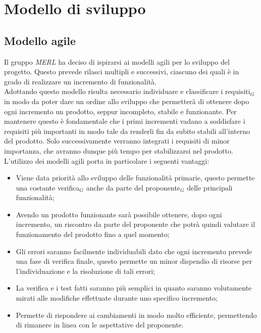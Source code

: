 \chapter{Modello di sviluppo}

\section{Modello agile}
Il gruppo \textit{MERL} ha deciso di ispirarsi ai modelli agili per lo sviluppo del progetto. Questo prevede rilasci multipli e successivi, ciascuno dei quali è in grado di realizzare un incremento di funzionalità.
\\Adottando questo modello risulta necessario individuare e classificare i requisiti$_G$ in modo da poter dare un ordine allo sviluppo che permetterà di ottenere dopo ogni incremento un prodotto, seppur incompleto, stabile e funzionante. Per mantenere questo è fondamentale che i primi incrementi vadano a soddisfare i requisiti più importanti in modo tale da renderli fin da subito stabili all'interno del prodotto. Solo successivamente verranno integrati i requisiti di minor importanza, che avranno dunque più tempo per stabilizzarsi nel prodotto.
\\L'utilizzo dei modelli agili porta in particolare i seguenti vantaggi:
\begin{itemize}
  \item Viene data priorità allo sviluppo delle funzionalità primarie, questo permette una costante verifica$_G$ anche da parte del proponente$_G$ delle principali funzionalità;
  \item Avendo un prodotto funzionante sarà possibile ottenere, dopo ogni incremento, un riscontro da parte del proponente che potrà quindi valutare il funzionamento del prodotto fino a quel momento;
  \item Gli errori saranno facilmente individuabili dato che ogni incremento prevede una fase di verifica finale, questo permette un minor dispendio di risorse per l'individuazione e la risoluzione di tali errori;
  \item La verifica e i test fatti saranno più semplici in quanto saranno volutamente mirati alle modifiche effettuate durante uno specifico incremento;
  \item Permette di rispondere ai cambiamenti in modo molto efficiente, permettendo di rimanere in linea con le aspettative del proponente.
\end{itemize}
